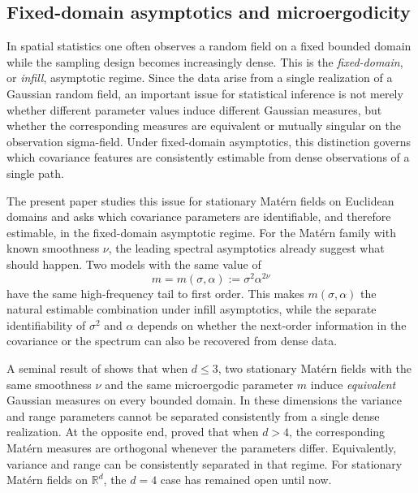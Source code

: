 \documentclass[11pt, reqno]{amsart}
\theoremstyle{remark}
\newcommand{\R}{\mathbb{R}}
\newcommand{\1}{\mathbf{1}}
\begin{document}
\subsection{Fixed-domain asymptotics and microergodicity}

In spatial statistics one often observes a random field on a fixed bounded
domain while the sampling design becomes increasingly dense.
This is the \emph{fixed-domain}, or \emph{infill}, asymptotic regime.
Since the data arise from a single realization of a Gaussian random field, an important issue for statistical inference is not merely whether different parameter values induce different Gaussian measures, but whether the corresponding measures are equivalent or mutually singular on the observation sigma-field. Under fixed-domain asymptotics, this distinction governs which covariance features are consistently estimable from dense observations of a single path.

The present paper studies this issue for stationary Mat\'ern fields on
Euclidean domains and asks which covariance parameters are identifiable,
and therefore estimable, in the fixed-domain asymptotic
regime. For the Mat\'ern family with known smoothness $\nu$, the leading spectral
asymptotics already suggest what should happen.
Two models with the same value of
\[
m = m(\sigma,\alpha) :=\sigma^2\alpha^{2\nu}
\]
have the same high-frequency tail to first order.
This makes $m(\sigma,\alpha)$ the natural estimable combination under infill
asymptotics, while the separate identifiability of $\sigma^2$ and $\alpha$
depends on whether the next-order information in the covariance or the
spectrum can also be recovered from dense data.

A seminal result of \citet{Zhang2004} shows that when $d\le 3$, two
stationary Mat\'ern fields with the same smoothness $\nu$ and the same
microergodic parameter $m$ induce \emph{equivalent} Gaussian measures on every bounded
domain.
In these dimensions the variance and range parameters cannot be separated
consistently from a single dense realization.
At the opposite end, \citet{Anderes2010} proved that when $d>4$, the
corresponding Mat\'ern measures are orthogonal whenever the parameters
differ.
Equivalently, variance and range can be consistently separated in that
regime. For stationary Mat\'ern fields on $\R^d$, the $d=4$ case has remained open until now.
\end{document}
